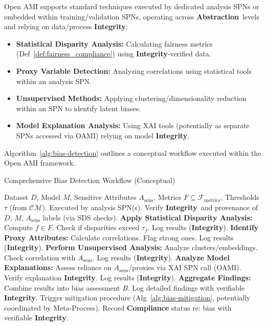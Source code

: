 \documentclass[12pt,a4paper]{report}
\newcommand{\Integrity}{\textbf{Integrity}}
\newcommand{\Abstraction}{\textbf{Abstraction}}
\begin{document}
	Open AMI supports standard techniques executed by dedicated analysis SPNs or embedded within training/validation SPNs, operating across \Abstraction\ levels and relying on data/process \Integrity:
	\begin{itemize}
		\item \textbf{Statistical Disparity Analysis:} Calculating fairness metrics (Def~\ref{def:fairness_compliance}) using \Integrity-verified data.
		\item \textbf{Proxy Variable Detection:} Analyzing correlations using statistical tools within an analysis SPN.
		\item \textbf{Unsupervised Methods:} Applying clustering/dimensionality reduction within an SPN to identify latent biases.
		\item \textbf{Model Explanation Analysis:} Using XAI tools (potentially as separate SPNs accessed via OAMI) relying on model \Integrity.
	\end{itemize}
	Algorithm~\ref{alg:bias-detection} outlines a conceptual workflow executed within the Open AMI framework.
	
	\begin{algorithm}[H]
		\caption{Comprehensive Bias Detection Workflow (Conceptual)}
		\label{alg:bias-detection}
		\begin{algorithmic}[1]
			\Require Dataset $D$, Model $M$, Sensitive Attributes $A_{\text{sens}}$, Metrics $F \subseteq \mathcal{F}_{\text{metrics}}$, Thresholds $\tau$ (from $\mathcal{CM}$). Executed by analysis SPN(s).
			\State Verify \Integrity\ and provenance of $D$, $M$, $A_{\text{sens}}$ labels (via SDS checks).
			\State \textbf{Apply Statistical Disparity Analysis:} Compute $f \in F$. Check if disparities exceed $\tau_f$. Log results (\Integrity).
			\State \textbf{Identify Proxy Attributes:} Calculate correlations. Flag strong ones. Log results (\Integrity).
			\State \textbf{Perform Unsupervised Analysis:} Analyze clusters/embeddings. Check correlation with $A_{\text{sens}}$. Log results (\Integrity).
			\State \textbf{Analyze Model Explanations:} Assess reliance on $A_{\text{sens}}$/proxies via XAI SPN call (OAMI). Verify explanation \Integrity. Log results (\Integrity).
			\State \textbf{Aggregate Findings:} Combine results into bias assessment $B$.
			\State Log detailed findings with verifiable \Integrity.
			\State Trigger mitigation procedure (Alg~\ref{alg:bias-mitigation}, potentially coordinated by Meta-Process).
			\Else
			\State Record \textbf{Compliance} status re: bias with verifiable \Integrity.
			\EndIf
		\end{algorithmic}
	\end{algorithm}
	
\end{document}

